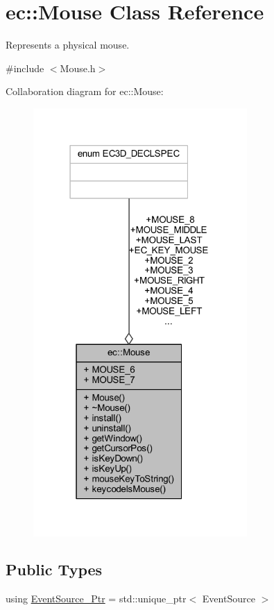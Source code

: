 \hypertarget{classec_1_1_mouse}{}\section{ec\+:\+:Mouse Class Reference}
\label{classec_1_1_mouse}


Represents a physical mouse.  




{\ttfamily \#include $<$Mouse.\+h$>$}



Collaboration diagram for ec\+:\+:Mouse\+:\nopagebreak
\begin{figure}[H]
\begin{center}
\leavevmode
\includegraphics[width=231pt]{classec_1_1_mouse__coll__graph}
\end{center}
\end{figure}
\subsection*{Public Types}
\begin{DoxyCompactItemize}
\item 
using \mbox{\hyperlink{classec_1_1_mouse_a6aa210c1821f23f8685a544a587ae11a}{Event\+Source\+\_\+\+Ptr}} = std\+::unique\+\_\+ptr$<$ Event\+Source $>$
\end{DoxyCompactItemize}
